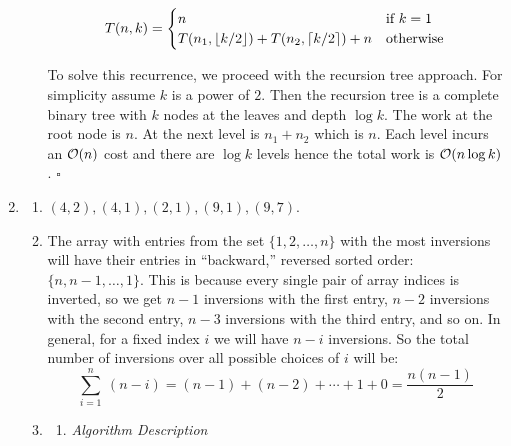\documentclass{article}
\begin{document}
\begin{enumerate}[leftmargin={*}, font={\bf}, label={\arabic*.}, ref={\arabic*}]
\begin{enumerate}
        \[
          T(n, k) =
            \begin{cases}
              n & \text{if}\ k = 1 \\ 
              T(n_1, \lfloor k/2\rfloor) + T(n_2, \lceil k/2\rceil) + n & \text{otherwise}
            \end{cases}
        \]

        To solve this recurrence, we proceed with the recursion tree approach. For simplicity
        assume $k$ is a power of $2$. Then the recursion tree is a complete binary tree with $k$
        nodes at the leaves and depth $\log k$. The work at the root node is $n$.  At the next
        level is $n_1 + n_2$ which is $n$. Each level incurs an $\operatorname*{\mathcal{O}}(n)$ cost and there are $\log
        k$ levels hence the total work is $\operatorname*{\mathcal{O}}(n \log k)$. \hfill $\square$
    \end{enumerate}

  \item \label{qst:2}
    \begin{enumerate}
      \item \label{qst:2a}
        $(4,2), (4,1), (2,1), (9,1), (9,7)$.

      \item \label{qst:2b}
        The array with entries from the set $\{1, 2, \ldots, n\}$ with the most inversions will
        have their entries in ``backward,'' reversed sorted order: $\{n, n-1, \ldots, 1\}$. This
        is because every single pair of array indices is inverted, so we get $n-1$ inversions
        with the first entry, $n-2$ inversions with the second entry, $n-3$ inversions with the
        third entry, and so on. In general, for a fixed index $i$ we will have $n-i$ inversions.
        So the total number of inversions over all possible choices of $i$ will be:
        \[
          \sum_{i=1}^{n}\ (n-i) = (n-1) + (n-2) + \cdots + 1 + 0 = \frac{n(n-1)}{2}
        \]

      \item \label{qst:2c}
        \begin{enumerate}[leftmargin={*}, label={\arabic*.}]
          \item
            {\it Algorithm Description}


\end{enumerate}
\end{enumerate}
\end{enumerate}
\end{document}
